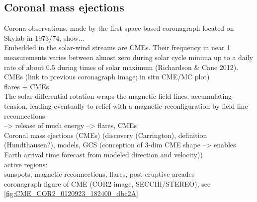 \subsection{Coronal mass ejections}
\label{sec:coronal_mass_ejections}

Corona observations, made by the first space-based coronagraph located on Skylab in 1973/74, show...\\

Embedded in the solar-wind streams are CMEs. Their frequency in near \SI{1}{\au} measurements varies between almost zero during solar cycle minima up to a daily rate of about $0.5$ during times of solar maximum (Richardson \& Cane 2012).\\


CMEs (link to previous coronagraph image; in situ CME/MC plot)\\

flares + CMEs\\

The solar differential rotation wraps the magnetic field lines, accumulating tension, leading eventually to relief with a magnetic reconfiguration by field line reconnections.\\
--> release of much energy --> flares, CMEs\\


Coronal mass ejections (CMEs) (discovery (Carrington), definition (Hundthausen?), models, GCS (conception of 3-dim CME shape --> enables Earth arrival time forecast from modeled direction and velocity))\\

active regions:\\
sunspots, magnetic reconnections, flares, post-eruptive arcades\\

coronagraph figure of CME (COR2 image, SECCHI/STEREO), see \autoref{fig:CME_COR2_0120923_182400_dbc2A}\\
\begin{figure}[htb]
\end{figure}

